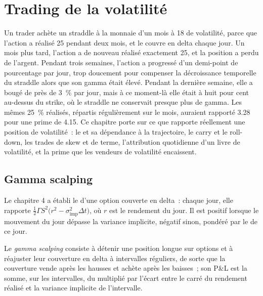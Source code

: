 \chapter{Trading de la volatilité}\label{ch:dv:trading-volatility}

Un trader achète un straddle à la monnaie d'un mois à 18 de volatilité, parce que l'action a réalisé 25 pendant deux mois, et le couvre en delta
chaque jour. Un mois plus tard, l'action a de nouveau réalisé exactement 25, et la position a perdu de l'argent. Pendant trois semaines, l'action a progressé d'un demi-point
de pourcentage par jour, trop doucement pour compenser la décroissance temporelle du straddle alors que son gamma était élevé. Pendant la dernière semaine, elle a bougé de près de 3~\% par jour, mais à ce moment-là elle
était à huit pour cent au-dessus du strike, où le straddle ne conservait presque plus de gamma. Les mêmes 25~\% réalisés, répartis régulièrement sur le mois, auraient
rapporté 3.28 pour une prime de 4.15. Ce chapitre porte sur ce que rapporte réellement une position de volatilité~: le  et sa dépendance à la trajectoire,
le carry et le roll-down, les trades de skew et de terme, l'attribution quotidienne d'un livre de volatilité, et la prime que les vendeurs de volatilité encaissent.

\section{Gamma scalping}

Le chapitre 4 a établi le  d'une option couverte en delta~: chaque jour, elle rapporte $\frac12\Gamma S^2\bigl(r^2-\sigma_{\text{imp}}^2\Delta t\bigr)$,
où $r$ est le rendement du jour. Il est positif lorsque le mouvement du jour dépasse la variance implicite, négatif sinon, pondéré par le
 de ce jour.

\begin{definition}\label{def:dv:trading-volatility:scalping}
Le \emph{gamma scalping} consiste à détenir une position longue sur options et à réajuster leur couverture en delta à intervalles réguliers, de sorte que la couverture vende
après les hausses et achète après les baisses~; son P\&L est la somme, sur les intervalles, du  multiplié par l'écart entre le carré du rendement réalisé
et la variance implicite de l'intervalle.
\end{definition}

